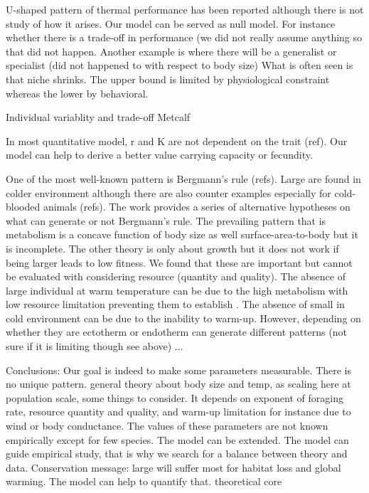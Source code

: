  U-shaped pattern of thermal performance has been reported although there is not study of how it arises.
 Our model can be served as null model.
 For instance whether there is a trade-off in performance (we did not really assume anything so that did not happen.
 Another example is where there will be a generalist or specialist (did not happened to with respect to body size)
 What is often seen is that niche shrinks.
 The upper bound is limited by physiological  constraint whereas the lower by behavioral.
 
 Individual variablity and trade-off Metcalf
  
 In most quantitative model, r and K are not dependent on the trait (ref).
 Our model can help to derive a better value carrying capacity or fecundity.
 

One of the most well-known pattern is Bergmann's rule (refs).
Large are found in colder environment although there are also counter examples especially for cold-blooded animals (refs).
The work provides a series of alternative hypotheses on what can generate or not Bergmann's rule.
The prevailing pattern that is metabolism is a concave function of body size as well surface-area-to-body but it is incomplete.
The other theory is only about growth but it does not work if being larger leads to low fitness.
We found that these are important but cannot be evaluated with considering resource (quantity and quality).
The absence of large individual at warm temperature can be due to the high metabolism with low resource limitation preventing them to establish \citep{Angert2005}. 
The absence of small in cold environment can be due to the inability to warm-up.
However, depending on whether they are ectotherm or endotherm can generate different patterns (not sure if it is limiting though see above)
...

Conclusions: Our goal is indeed to make some parameters measurable.
There is no unique pattern.
general theory about body size and temp, as scaling here
at population scale, some things to consider.
It depends on exponent of foraging rate, resource quantity and quality, and warm-up limitation for instance due to wind or body conductance.
The values of these parameters  are not known empirically except for few species.
The model can be extended.
The model can guide empirical study, that is why we search for a balance between theory and data.
Conservation message: large will suffer most for habitat loss and global warming.
The model can help to quantify that. 
theoretical core
 

